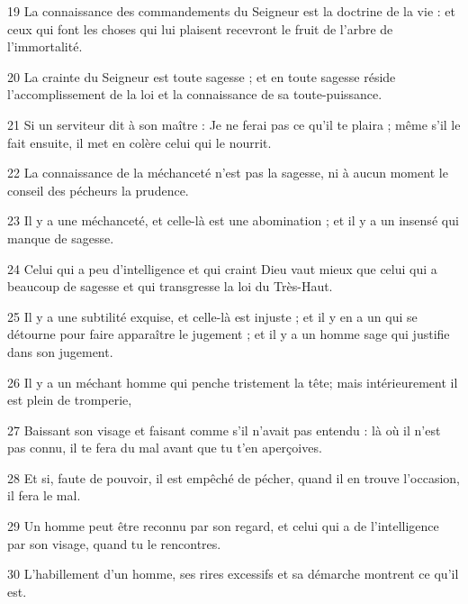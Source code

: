 \par 19 La connaissance des commandements du Seigneur est la doctrine de la vie : et ceux qui font les choses qui lui plaisent recevront le fruit de l'arbre de l'immortalité.
\par 20 La crainte du Seigneur est toute sagesse ; et en toute sagesse réside l'accomplissement de la loi et la connaissance de sa toute-puissance.
\par 21 Si un serviteur dit à son maître : Je ne ferai pas ce qu'il te plaira ; même s'il le fait ensuite, il met en colère celui qui le nourrit.
\par 22 La connaissance de la méchanceté n'est pas la sagesse, ni à aucun moment le conseil des pécheurs la prudence.
\par 23 Il y a une méchanceté, et celle-là est une abomination ; et il y a un insensé qui manque de sagesse.
\par 24 Celui qui a peu d'intelligence et qui craint Dieu vaut mieux que celui qui a beaucoup de sagesse et qui transgresse la loi du Très-Haut.
\par 25 Il y a une subtilité exquise, et celle-là est injuste ; et il y en a un qui se détourne pour faire apparaître le jugement ; et il y a un homme sage qui justifie dans son jugement.
\par 26 Il y a un méchant homme qui penche tristement la tête; mais intérieurement il est plein de tromperie,
\par 27 Baissant son visage et faisant comme s'il n'avait pas entendu : là où il n'est pas connu, il te fera du mal avant que tu t'en aperçoives.
\par 28 Et si, faute de pouvoir, il est empêché de pécher, quand il en trouve l'occasion, il fera le mal.
\par 29 Un homme peut être reconnu par son regard, et celui qui a de l'intelligence par son visage, quand tu le rencontres.
\par 30 L'habillement d'un homme, ses rires excessifs et sa démarche montrent ce qu'il est.


